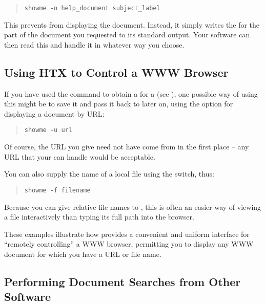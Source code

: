 \begin{quote}
\begin{verbatim}
showme -n help_document subject_label
\end{verbatim}
\end{quote}

This prevents  from displaying the document. Instead, it
simply writes the  for the part of the document you
requested to its standard output. Your software can then read this and
handle it in whatever way you choose.

\subsection{Using HTX to Control a WWW Browser}

If you have used the  command to obtain a
 for a  (see
), one possible way of using
this might be to save it and pass it back to  later on,
using the  option for displaying a document by URL:

\begin{quote}
\begin{verbatim}
showme -u url
\end{verbatim}
\end{quote}

Of course, the URL you give need not have come from  in the
first place -- any URL that your  can handle would be acceptable.

You can also supply the name of a local file using the  switch,
thus:

\begin{quote}
\begin{verbatim}
showme -f filename
\end{verbatim}
\end{quote}

Because you can give relative file names to , this is often
an easier way of viewing a file interactively than typing its full
path into the browser.

These examples illustrate how  provides a convenient and
uniform interface for ``remotely controlling'' a WWW browser,
permitting you to display any WWW document for which you have a URL or
file name.

\subsection{Performing Document Searches from Other Software}

